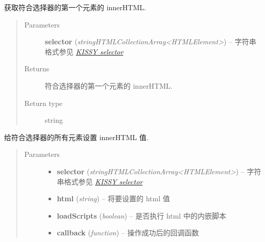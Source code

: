 \documentclass[letterpaper,10pt,english]{sphinxmanual}
\begin{document}
\begin{fulllineitems}
\label{api/core/dom/html:DOM.html}
获取符合选择器的第一个元素的 innerHTML.
\begin{quote}\begin{description}
\item[{Parameters}] \leavevmode
\textbf{selector} (\emph{string\textbar{}HTMLCollection\textbar{}Array\textless{}HTMLElement\textgreater{}}) -- 字符串格式参见 {\hyperref[api/core/dom/selector:dom-selector]{\emph{KISSY selector}}}

\item[{Returns}] \leavevmode
符合选择器的第一个元素的 innerHTML.

\item[{Return type}] \leavevmode
string

\end{description}\end{quote}

\end{fulllineitems}



\begin{fulllineitems}
给符合选择器的所有元素设置 innerHTML 值.
\begin{quote}\begin{description}
\item[{Parameters}] \leavevmode\begin{itemize}
\item {}
\textbf{selector} (\emph{string\textbar{}HTMLCollection\textbar{}Array\textless{}HTMLElement\textgreater{}}) -- 字符串格式参见 {\hyperref[api/core/dom/selector:dom-selector]{\emph{KISSY selector}}}

\item {}
\textbf{html} (\emph{string}) -- 将要设置的 html 值

\item {}
\textbf{loadScripts} (\emph{boolean}) -- 是否执行 html 中的内嵌脚本

\item {}
\textbf{callback} (\emph{function}) -- 操作成功后的回调函数

\end{itemize}

\end{description}\end{quote}

\end{fulllineitems}
\end{document}
